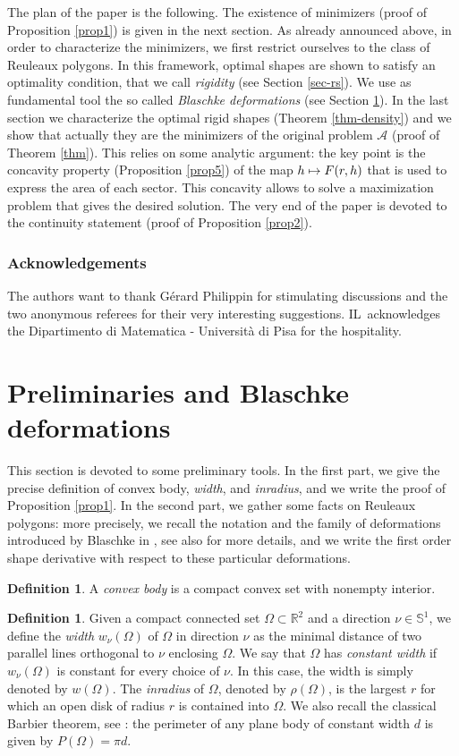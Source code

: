\documentclass[JEP,XML,SOM,Unicode,NoFloatCountersInSection]{cedram}
\let\mathcal\mathscr
\newcommand\mto{\mathchoice{\longmapsto}{\mapsto}{\mapsto}{\mapsto}}
\theoremstyle{plain}
\theoremstyle{definition}
\newtheorem{definition}[theorem]{Definition}
\newcommand\A{\mathcal A}
\let\Om\Omega
\begin{document}
The plan of the paper is the following. The existence of minimizers (proof of Proposition \ref{prop1}) is given in the next section. As already announced above, in order to characterize the minimizers, we first restrict ourselves to the class of Reuleaux polygons. In this framework, optimal shapes are shown to satisfy an optimality condition, that we call \emph{rigidity} (see Section \ref{sec-rs}). We use as fundamental tool the so called \emph{Blaschke deformations} (see Section \ref{sec-prel}). In the last section we characterize the optimal rigid shapes (Theorem \ref{thm-density}) and we show that actually they are the minimizers of the original problem $\A$ (proof of Theorem \ref{thm}). {This relies on some analytic argument: the key
point is the concavity property (Proposition \ref{prop5})
of the map $h\mto F(r,h)$ that is used to express the area of
each sector. This concavity allows to solve a maximization problem that gives the desired solution.}
The very end of the paper is devoted to the continuity statement (proof of Proposition \ref{prop2}).

\subsubsection*{Acknowledgements}
The authors want to thank Gérard Philippin for stimulating discussions and the two anonymous referees for their very interesting suggestions. IL~acknowledges the Dipartimento di Matematica - Università di Pisa for the hospitality.

\section{Preliminaries and Blaschke deformations}\label{sec-prel}
This section is devoted to some preliminary tools. In the first part, we give the precise definition of {convex body}, \emph{width}, and \emph{inradius}, and we write the proof of Proposition \ref{prop1}. In the second part, we gather some facts on Reuleaux polygons: more precisely, we recall the notation and the family of deformations introduced by Blaschke in \cite{Bla},
see also \cite{KM} for more details, and we write the first order shape derivative with respect to these particular deformations.
{\begin{definition}
A \emph{convex body} is a compact convex set with nonempty interior.
\end{definition}}
\begin{definition}
Given a {compact connected} set $\Omega\subset \mathbb R^2$ and a direction $\nu \in \mathbb S^1$, we define the \emph{width} $w_\nu(\Omega)$ of $\Omega$ in direction $\nu$ as the minimal distance of two parallel lines orthogonal to $\nu$ enclosing $\Omega$. We say that $\Omega$ has \emph{constant width} if $w_\nu(\Omega)$ is constant for every choice of $\nu$. In this case, the width is simply denoted by $w(\Omega)$.
The \emph{inradius} of $\Omega$, denoted by $\rho(\Omega)$, is the largest $r$ for which an open disk of radius $r$ is contained into $\Omega$. We also recall the classical Barbier theorem, see
\cite{CG}: the perimeter of any plane body of constant width $d$ is given by $P(\Om)=\pi d$.
\end{definition}
\end{document}
